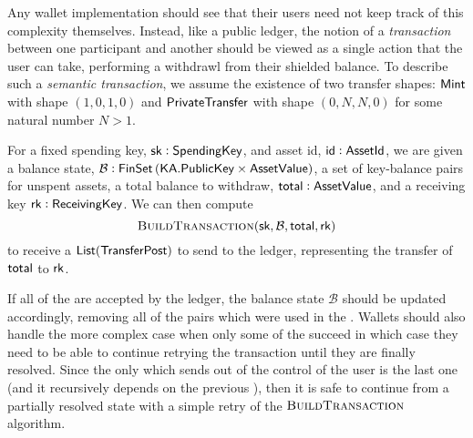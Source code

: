 Any wallet implementation should see that their users need not keep track of this complexity themselves. Instead, like a public ledger, the notion of a \emph{transaction} between one participant and another should be viewed as a single action that the user can take, performing a withdrawl from their shielded balance. To describe such a \emph{semantic transaction}, we assume the existence of two transfer shapes\footnotemark{}: ${\textsf{Mint}}$ with shape $(1, 0, 1, 0)$ and ${\textsf{PrivateTransfer}}$ with shape $(0, N, N, 0)$ for some natural number $N > 1$.


For a fixed spending key, ${\textsf{sk}} : {\textsf{SpendingKey}}$, and asset id, ${\textsf{id}} : {\textsf{AssetId}}$, we are given a balance state, $\mathcal{B} : {\textsf{FinSet}}\left({\textsf{KA}}.{\textsf{PublicKey}} \times {\textsf{AssetValue}}\right)$, a set of key-balance pairs for unspent assets, a total balance to withdraw, ${\textsf{total}} : {\textsf{AssetValue}}$, and a receiving key ${\textsf{rk}} : {\textsf{ReceivingKey}}$. We can then compute 
\[\textsc{BuildTransaction}({\textsf{sk}}, \mathcal{B}, {\textsf{total}}, {\textsf{rk}})\]
to receive a ${\textsf{List}}({\textsf{TransferPost}})$ to send to the ledger, representing the transfer of ${\textsf{total}}$ to ${\textsf{rk}}$.

If all of the  are accepted by the ledger, the balance state $\mathcal{B}$ should be updated accordingly, removing all of the pairs which were used in the \Transfer{}. Wallets should also handle the more complex case when only some of the  succeed in which case they need to be able to continue retrying the transaction until they are finally resolved. Since the only \Transfer{} which sends  out of the control of the user is the last one (and it recursively depends on the previous ), then it is safe to continue from a partially resolved state with a simple retry of the $\textsc{BuildTransaction}$ algorithm.
